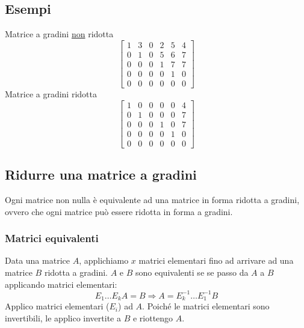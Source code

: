 \documentclass[italian]{article}
\begin{document}
\subsection{Esempi}
Matrice a gradini \underline{non} ridotta
\[
	\begin{bmatrix}
		1 &  3 &  0 &  2 &  5 &  4 \\
		0 &  1 &  0 &  5 &  6 &  7 \\
		0 &  0 &  0 &  1 &  7 &  7 \\
		0 &  0 &  0 &  0 &  1 &  0 \\
		0 &  0 &  0 &  0 &  0 &  0
	\end{bmatrix}
\]
Matrice a gradini ridotta
\[
	\begin{bmatrix}
		1 &  0 &  0 &  0 &  0 &  4 \\
		0 &  1 &  0 &  0 &  0 &  7 \\
		0 &  0 &  0 &  1 &  0 &  7 \\
		0 &  0 &  0 &  0 &  1 &  0 \\
		0 &  0 &  0 &  0 &  0 &  0
	\end{bmatrix}
\]

\subsection{Ridurre una matrice a gradini}
Ogni matrice non nulla è equivalente ad una matrice in forma ridotta a gradini, ovvero che ogni matrice può essere ridotta in forma a gradini.
\subsubsection{Matrici equivalenti}
Data una matrice $A$, applichiamo $x$ matrici elementari fino ad arrivare ad una matrice $B$ ridotta a gradini. $A$ e $B$ sono equivalenti se se passo da $A$ a $B$ applicando matrici elementari:
\[
	E_1 \dots E_kA = B \Rightarrow A = E^{-1}_k \dots E^{-1}_1B
\]
Applico matrici elementari ($E_i$) ad $A$. Poiché le matrici elementari sono invertibili, le applico invertite a $B$ e riottengo $A$.

\pagebreak
\end{document}
